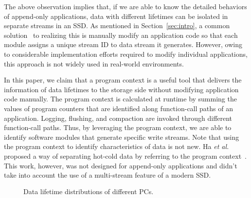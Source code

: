 The above observation implies that, if we are able to know the detailed
behaviors of append-only applications, data with different lifetimes can be
isolated in separate streams in an SSD. As mentioned in Section~\ref{sec:intro}, a
common solution~\cite{MultiStream} to realizing this is manually modify an
application code so that each module assigns a unique stream ID to data stream
it generates. However, owing to considerable implementation efforts
required to modify individual applications, this approach is not widely used in
real-world environments.

In this paper, we claim that a program context is a useful tool that delivers
the information of data lifetimes to the storage side without modifying application
code manually. The program context is calculated at runtime by summing the
values of program counters that are identified along function-call paths
of an application. Logging, flushing, and compaction are invoked through
different function-call paths. Thus, by leveraging the program context, we are
able to identify software modules that generate specific write streams. Note
that using the program context to identify characteristics of data is not new.
Ha \textit{et al.} proposed a way of separating hot-cold data by referring to the program
context~\cite{PCHa}. This work, however, was not designed for append-only
applications and didn't take into account the use of a multi-stream feature of
a modern SSD.

\begin{figure}[!t]
\centering
\hspace{1pt}
\hfill
\vspace{-10pt}
\caption{Data lifetime distributions of different PCs.} 
\label{fig:types_and_PCs}
\vspace{-20pt}
\end{figure}

